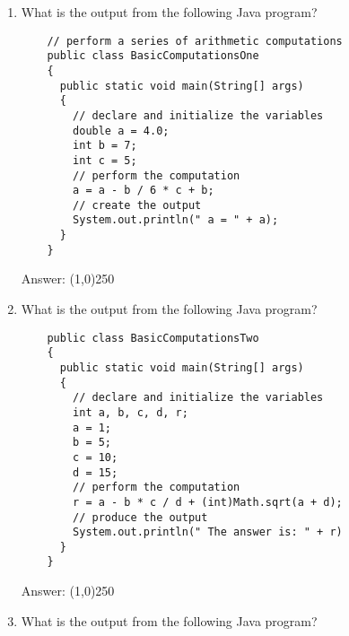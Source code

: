 \documentclass[12pt]{article}
\begin{document}
\begin{enumerate}

\item What is the output from the following Java program?

\hspace*{.25in}
\begin{minipage}{6in}
  \lstset{numbers=left}
  \begin{lstlisting}
    // perform a series of arithmetic computations
    public class BasicComputationsOne
    {
      public static void main(String[] args)
      {
        // declare and initialize the variables
        double a = 4.0;
        int b = 7;
        int c = 5;
        // perform the computation
        a = a - b / 6 * c + b;
        // create the output
        System.out.println(" a = " + a);
      }
    }
  \end{lstlisting}

\end{minipage}

Answer: \line(1,0){250}

\newpage

\item What is the output from the following Java program?

\hspace*{.25in}
\begin{minipage}{6in}
  \lstset{numbers=left}
  \begin{lstlisting}
    public class BasicComputationsTwo
    {
      public static void main(String[] args)
      {
        // declare and initialize the variables
        int a, b, c, d, r;
        a = 1;
        b = 5;
        c = 10;
        d = 15;
        // perform the computation
        r = a - b * c / d + (int)Math.sqrt(a + d);
        // produce the output
        System.out.println(" The answer is: " + r)
      }
    }
  \end{lstlisting}

\end{minipage}

Answer: \line(1,0){250}

\item What is the output from the following Java program?


\end{enumerate}
\end{document}
